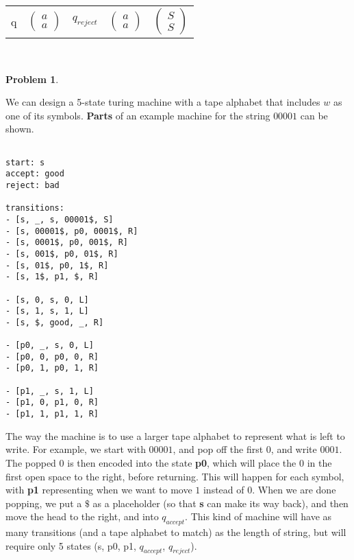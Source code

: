 \documentclass[11pt]{article}
\theoremstyle{definition}
\theoremstyle{case}
\theoremstyle{theorem}
\newtheorem{prob}{Problem}
\begin{document}
\vspace{10pt}

\begin{tabular}{l l l l l}
			q & 
			$\begin{pmatrix} a \\ a \end{pmatrix}$ & 
			$q_{reject}$ & 
			$\begin{pmatrix} a \\ a \end{pmatrix}$ & 
			$\begin{pmatrix} S \\ S \end{pmatrix}$
\end{tabular}\\

\newpage

\begin{prob}\end{prob}

We can design a 5-state turing machine with a tape alphabet that includes $w$ as one of its symbols.
\textbf{Parts} of an example machine for the string $00001$ can be shown. 

\begin{verbatim}

start: s
accept: good
reject: bad

transitions: 
- [s, _, s, 00001$, S]
- [s, 00001$, p0, 0001$, R]
- [s, 0001$, p0, 001$, R]
- [s, 001$, p0, 01$, R]
- [s, 01$, p0, 1$, R]
- [s, 1$, p1, $, R]

- [s, 0, s, 0, L]
- [s, 1, s, 1, L]
- [s, $, good, _, R]

- [p0, _, s, 0, L]
- [p0, 0, p0, 0, R]
- [p0, 1, p0, 1, R]

- [p1, _, s, 1, L]
- [p1, 0, p1, 0, R]
- [p1, 1, p1, 1, R]

\end{verbatim}

The way the machine is to use a larger tape alphabet to represent what is
left to write. For example, we start with $00001$, and pop off the first $0$,
and write $0001$. The popped $0$ is then encoded into the state \textbf{p0}, which will 
place the $0$ in the first open space to the right, before returning. This
will happen for each symbol, with \textbf{p1} representing when we want to move $1$ instead of $0$.
When we are done popping, we put a $\$$ as a placeholder (so that \textbf{s} can
make its way back), and then move the head to the right, and into $q_{accept}$. This
kind of machine will have as many transitions (and a tape alphabet to match) as the length
of string, but will require only 5 states (s, p0, p1, $q_{accept}$, $q_{reject}$).
\end{document}
